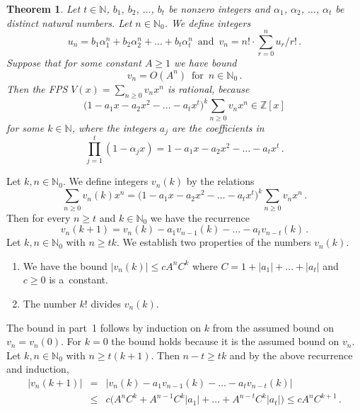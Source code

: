 \documentclass[10pt]{article}
\def\N{\mathbb{N}}
\def\Z{\mathbb{Z}}
\def\proof{\par\noindent{\em Proof. }}
\def\ds{\dots}
\def\al{\alpha}
\newtheorem{thm}{Theorem}[section]
\begin{document}
\begin{thm}\label{thm_rational}
Let $t\in\N$, $b_1$, $b_2$, $\ds$, $b_t$ be nonzero integers and $\al_1$, $\al_2$, $\ds$, $\al_t$ be distinct natural numbers. Let $n\in\N_0$. We define
integers
$$
u_n=b_1\al_1^n+b_2\al_2^n+\ds+b_t\al_t^n\,\text{ and }\,v_n=n!\cdot{\textstyle
\sum_{r=0}^n u_r/r!}\,.
$$
Suppose that for some constant $A\ge1$ we have bound
$$
v_n=O(A^n)\,\text{ for }\,n\in\N_0\,. 
$$
Then the {\em FPS}   $V(x)=\sum_{n\ge0}v_nx^n$ is rational,  because 
$$
{\textstyle
\big(1-a_1x-a_2x^2-\ds-a_tx^t\big)^k\sum_{n\ge0}v_nx^n\in\Z[x]
}
$$
for some $k\in\N$, where the integers $a_j$ are the coefficients in
$$
{\textstyle
\prod_{j=1}^t(1-\al_jx)=1-a_1x-a_2x^2-\ds-a_tx^t\,.
}
$$
\end{thm}
\proof
Let $k,n\in\N_0$. We define integers $v_n(k)$ by the relations
$$
{\textstyle
\sum_{n\ge0}v_n(k)x^n=
\big(1-a_1x-a_2x^2-\ds-a_tx^t\big)^k\sum_{n\ge0}v_nx^n\,.
}
$$
Then for every $n\ge t$ and $k\in\N_0$ we have the recurrence
$$
v_n(k+1)=v_n(k)-a_1v_{n-1}(k)-\ds-a_tv_{n-t}(k)\,.
$$
Let $k,n\in\N_0$ with $n\ge tk$. We establish two properties of the numbers $v_n(k)$.
\begin{enumerate}
\item We have the bound $|v_n(k)|\le cA^nC^k$ where $C=1+|a_1|+\ds+|a_t|$ and $c\ge0$ is a~constant.
\item The number $k!$ divides $v_n(k)$.
\end{enumerate}
The bound in part~1 follows by induction on $k$
from the assumed bound on $v_n=v_n(0)$. For $k=0$ the bound 
holds because it is the assumed bound on $v_n$. Let $k,n\in\N_0$ with $n\ge 
t(k+1)$. Then $n-t\ge tk$ and
by the above recurrence and induction, 
\begin{eqnarray*}
|v_n(k+1)|&=&|v_n(k)-a_1v_{n-1}(k)-\ds-a_tv_{n-t}(k)|\\
&\le&c\big(A^nC^k+A^{n-1}C^k|a_1|+\ds+
A^{n-t}C^k|a_t|\big)\le cA^nC^{k+1}\,.
\end{eqnarray*}
\end{document}
